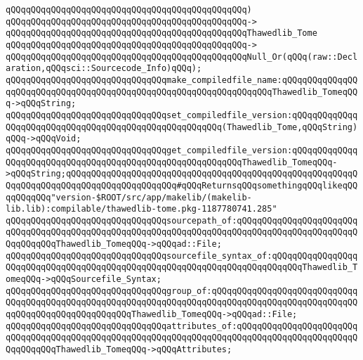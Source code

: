 \verb|qQQqqQQqqQQqqQQqqQQqqQQqqQQqqQQqqQQqqQQqqQQqqQQq)|\newline
\verb|qQQqqQQqqQQqqQQqqQQqqQQqqQQqqQQqqQQqqQQqqQQqqQQq->|\newline
\verb|qQQqqQQqqQQqqQQqqQQqqQQqqQQqqQQqqQQqqQQqqQQqqQQqThawedlib_Tome|\newline
\verb|qQQqqQQqqQQqqQQqqQQqqQQqqQQqqQQqqQQqqQQqqQQqqQQq->|\newline
\verb|qQQqqQQqqQQqqQQqqQQqqQQqqQQqqQQqqQQqqQQqqQQqqQQqNull_Or(qQQq(raw::Declaration,qQQqsci::Sourcecode_Info)qQQq);|\newline
\newline
\newline
\newline
\verb|qQQqqQQqqQQqqQQqqQQqqQQqqQQqqQQqmake_compiledfile_name:qQQqqQQqqQQqqQQqqQQqqQQqqQQqqQQqqQQqqQQqqQQqqQQqqQQqqQQqqQQqqQQqqQQqThawedlib_TomeqQQq->qQQqString;|\newline
\newline
\newline
\verb|qQQqqQQqqQQqqQQqqQQqqQQqqQQqqQQqset_compiledfile_version:qQQqqQQqqQQqqQQqqQQqqQQqqQQqqQQqqQQqqQQqqQQqqQQqqQQqqQQq(Thawedlib_Tome,qQQqString)qQQq->qQQqVoid;|\newline
\verb|qQQqqQQqqQQqqQQqqQQqqQQqqQQqqQQqget_compiledfile_version:qQQqqQQqqQQqqQQqqQQqqQQqqQQqqQQqqQQqqQQqqQQqqQQqqQQqqQQqqQQqThawedlib_TomeqQQq->qQQqString;qQQqqQQqqQQqqQQqqQQqqQQqqQQqqQQqqQQqqQQqqQQqqQQqqQQqqQQqqQQqqQQqqQQqqQQqqQQqqQQqqQQqqQQqqQQq#qQQqReturnsqQQqsomethingqQQqlikeqQQqqQQqqQQq"version-$ROOT/src/app/makelib/(makelib-lib.lib):compilable/thawedlib-tome.pkg-1187780741.285"|\newline
\newline
\verb|qQQqqQQqqQQqqQQqqQQqqQQqqQQqqQQqsourcepath_of:qQQqqQQqqQQqqQQqqQQqqQQqqQQqqQQqqQQqqQQqqQQqqQQqqQQqqQQqqQQqqQQqqQQqqQQqqQQqqQQqqQQqqQQqqQQqqQQqqQQqqQQqThawedlib_TomeqQQq->qQQqad::File;|\newline
\verb|qQQqqQQqqQQqqQQqqQQqqQQqqQQqqQQqsourcefile_syntax_of:qQQqqQQqqQQqqQQqqQQqqQQqqQQqqQQqqQQqqQQqqQQqqQQqqQQqqQQqqQQqqQQqqQQqqQQqqQQqThawedlib_TomeqQQq->qQQqSourcefile_Syntax;|\newline
\newline
\verb|qQQqqQQqqQQqqQQqqQQqqQQqqQQqqQQqgroup_of:qQQqqQQqqQQqqQQqqQQqqQQqqQQqqQQqqQQqqQQqqQQqqQQqqQQqqQQqqQQqqQQqqQQqqQQqqQQqqQQqqQQqqQQqqQQqqQQqqQQqqQQqqQQqqQQqqQQqqQQqqQQqThawedlib_TomeqQQq->qQQqad::File;|\newline
\verb|qQQqqQQqqQQqqQQqqQQqqQQqqQQqqQQqattributes_of:qQQqqQQqqQQqqQQqqQQqqQQqqQQqqQQqqQQqqQQqqQQqqQQqqQQqqQQqqQQqqQQqqQQqqQQqqQQqqQQqqQQqqQQqqQQqqQQqqQQqqQQqThawedlib_TomeqQQq->qQQqAttributes;|\newline
